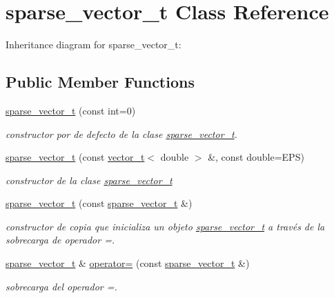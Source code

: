 \hypertarget{classsparse__vector__t}{}\section{sparse\+\_\+vector\+\_\+t Class Reference}
\label{classsparse__vector__t}


Inheritance diagram for sparse\+\_\+vector\+\_\+t\+:
\subsection*{Public Member Functions}
\begin{DoxyCompactItemize}
\item 
\mbox{\label{classsparse__vector__t_a0708afb6f0b69cfaf7b3583452a6913b}} 
\hyperlink{classsparse__vector__t_a0708afb6f0b69cfaf7b3583452a6913b}{sparse\+\_\+vector\+\_\+t} (const int=0)
\begin{DoxyCompactList}\small\item\em constructor por de defecto de la clase \hyperlink{classsparse__vector__t}{sparse\+\_\+vector\+\_\+t}. \end{DoxyCompactList}\item 
\hyperlink{classsparse__vector__t_a2265c18c50a8788d631ee584873b1d88}{sparse\+\_\+vector\+\_\+t} (const \hyperlink{classvector__t}{vector\+\_\+t}$<$ double $>$ \&, const double=E\+PS)
\begin{DoxyCompactList}\small\item\em constructor de la clase \hyperlink{classsparse__vector__t}{sparse\+\_\+vector\+\_\+t} \end{DoxyCompactList}\item 
\hyperlink{classsparse__vector__t_a94f58b310542bbd9f781c6667fb89d06}{sparse\+\_\+vector\+\_\+t} (const \hyperlink{classsparse__vector__t}{sparse\+\_\+vector\+\_\+t} \&)
\begin{DoxyCompactList}\small\item\em constructor de copia que inicializa un objeto \hyperlink{classsparse__vector__t}{sparse\+\_\+vector\+\_\+t} a través de la sobrecarga de operador =. \end{DoxyCompactList}\item 
\hyperlink{classsparse__vector__t}{sparse\+\_\+vector\+\_\+t} \& \hyperlink{classsparse__vector__t_a5af8b6772b5e21b427ba8db08742ff9b}{operator=} (const \hyperlink{classsparse__vector__t}{sparse\+\_\+vector\+\_\+t} \&)
\begin{DoxyCompactList}\small\item\em sobrecarga del operador =. \end{DoxyCompactList}\item 

\end{DoxyCompactItemize}
